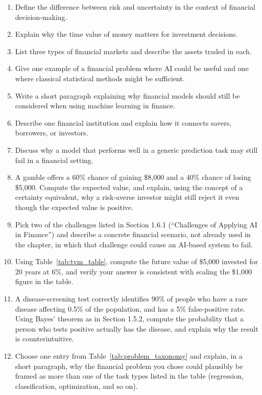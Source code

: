 \documentclass[../ai_in_finance]{subfiles}
\begin{document}
\begin{enumerate}
    \item Define the difference between risk and uncertainty in the context of financial decision-making.
    \item Explain why the time value of money matters for investment decisions.
    \item List three types of financial markets and describe the assets traded in each.
    \item Give one example of a financial problem where AI could be useful and one where classical statistical methods might be sufficient.
    \item Write a short paragraph explaining why financial models should still be considered when using machine learning in finance.
    \item Describe one financial institution and explain how it connects savers, borrowers, or investors.
    \item Discuss why a model that performs well in a generic prediction task may still fail in a financial setting.
    \item A gamble offers a 60\% chance of gaining \$8,000 and a 40\% chance of losing \$5,000. Compute the expected value, and explain, using the concept of a certainty equivalent, why a risk-averse investor might still reject it even though the expected value is positive.
    \item Pick two of the challenges listed in Section 1.6.1 (``Challenges of Applying AI in Finance'') and describe a concrete financial scenario, not already used in the chapter, in which that challenge could cause an AI-based system to fail.
    \item Using Table~\ref{tab:tvm_table}, compute the future value of \$5,000 invested for 20 years at 6\%, and verify your answer is consistent with scaling the \$1,000 figure in the table.
    \item A disease-screening test correctly identifies 90\% of people who have a rare disease affecting 0.5\% of the population, and has a 5\% false-positive rate. Using Bayes' theorem as in Section 1.5.2, compute the probability that a person who tests positive actually has the disease, and explain why the result is counterintuitive.
    \item Choose one entry from Table~\ref{tab:problem_taxonomy} and explain, in a short paragraph, why the financial problem you chose could plausibly be framed as more than one of the task types listed in the table (regression, classification, optimization, and so on).

\end{enumerate}
\end{document}
